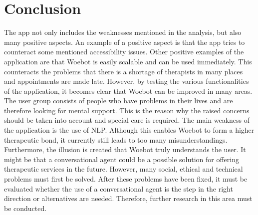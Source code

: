 \section{Conclusion}\label{sec:conclusion}
The app not only includes the weaknesses mentioned in the analysis, but also many positive aspects.
An example of a positive aspect is that the app tries to counteract some mentioned accessibility issues.
Other positive examples of the application are that Woebot is easily scalable and can be used immediately.
This counteracts the problems that there is a shortage of therapists in many places and appointments are made late.
However, by testing the various functionalities of the application, it becomes clear that Woebot can be improved in many areas.
The user group consists of people who have problems in their lives and are therefore looking for mental support.
This is the reason why the raised concerns should be taken into account and special care is required.
The main weakness of the application is the use of NLP.
Although this enables Woebot to form a higher therapeutic bond, it currently still leads to too many misunderstandings.
Furthermore, the illusion is created that Woebot truly understands the user.
It might be that a conversational agent could be a possible solution for offering therapeutic services in the future.
However, many social, ethical and technical problems must first be solved.
After these problems have been fixed, it must be evaluated whether the use of a conversational agent is the step in the right direction or alternatives are needed.
Therefore, further research in this area must be conducted.
